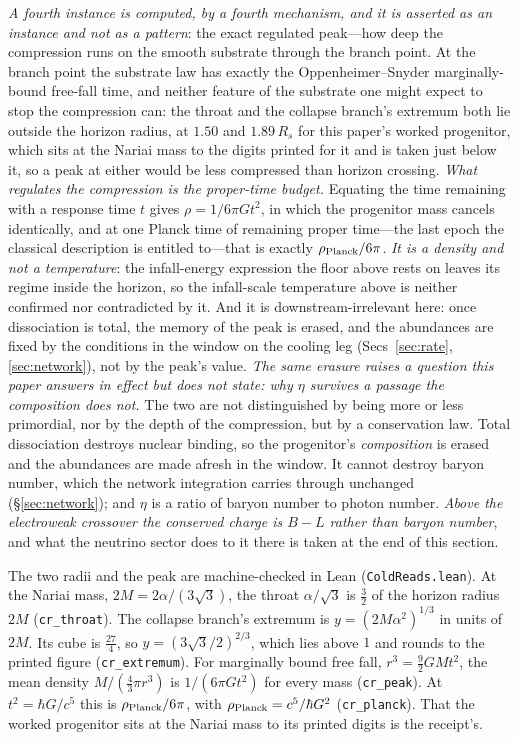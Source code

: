 \documentclass[11pt,a4paper]{article}
\theoremstyle{plain}
\theoremstyle{definition}
\theoremstyle{remark}
\begin{document}
\emph{A fourth instance is computed, by a fourth mechanism, and it is asserted as an instance and not
as a pattern}: the exact regulated peak---how deep the compression runs on the smooth substrate
through the branch point. At the branch point the substrate law has exactly the Oppenheimer--Snyder
marginally-bound free-fall time, and neither feature of the substrate one might expect to stop the
compression can: the throat and the collapse branch's extremum both lie outside the horizon radius,
at $1.50$ and $1.89\,R_s$ for this paper's worked progenitor, which sits at the Nariai mass to the digits printed
for it and is taken just below it, so a peak at either would be less
compressed than horizon crossing. \emph{What regulates the compression is the proper-time budget.}
Equating the time remaining with a response time $t$ gives $\rho=1/6\pi Gt^{2}$, in which the
progenitor mass cancels identically, and at one Planck time of remaining proper time---the last epoch
the classical description is entitled to---that is exactly
$\rho_{\rm Planck}/6\pi$. \emph{It is a
density and not a temperature}: the infall-energy expression the floor above rests on leaves its regime
inside the horizon, so the infall-scale temperature above is neither confirmed nor contradicted by it. And it is
downstream-irrelevant here: once dissociation is total, the memory of the peak is erased,
and the abundances are fixed by the conditions in the window on the cooling leg
(Secs~\ref{sec:rate}, \ref{sec:network}), not by the peak's value. \emph{The same erasure raises a question this paper answers in effect but does not state: why $\eta$
survives a passage the composition does not.} The two are not distinguished by being more or less primordial,
nor by the depth of the compression, but by a conservation law. Total dissociation destroys nuclear binding, so
the progenitor's \emph{composition} is erased and the abundances are made afresh in the window. It cannot
destroy baryon number, which the network integration carries through unchanged
(\S\ref{sec:network}); and $\eta$ is a ratio of baryon number to photon number. \emph{Above the electroweak
crossover the conserved charge is $B-L$ rather than baryon number}, and what the neutrino sector does to it
there is taken at the end of this section.

The two radii and the peak are machine-checked in Lean (\texttt{ColdReads.lean}). At the Nariai mass, $2M=2\alpha/(3\sqrt3)$, the throat $\alpha/\sqrt3$ is $\tfrac32$ of the horizon radius $2M$ (\texttt{cr\_throat}). The collapse branch's extremum is $y=(2M\alpha^{2})^{1/3}$ in units of $2M$. Its cube is $\tfrac{27}{4}$, so $y=(3\sqrt3/2)^{2/3}$, which lies above $1$ and rounds to the printed figure (\texttt{cr\_extremum}). For marginally bound free fall, $r^{3}=\tfrac92GMt^{2}$, the mean density $M/(\tfrac43\pi r^{3})$ is $1/(6\pi Gt^{2})$ for every mass (\texttt{cr\_peak}). At $t^{2}=\hbar G/c^{5}$ this is $\rho_{\rm Planck}/6\pi$, with $\rho_{\rm Planck}=c^{5}/\hbar G^{2}$ (\texttt{cr\_planck}). That the worked progenitor sits at the Nariai mass to its printed digits is the receipt's.
\end{document}
